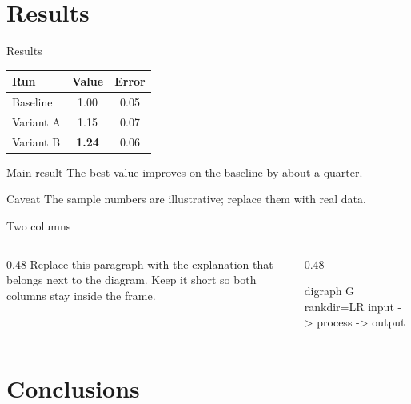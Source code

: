 \documentclass[aspectratio=169,14pt]{beamer}
\begin{document}
  \section{Results}

  \begin{frame}{Results}
    \begin{center}
      \begin{tabular}{lcc}
        \toprule
        Run & Value & Error \\
        \midrule
        Baseline & 1.00 & 0.05 \\
        Variant A & 1.15 & 0.07 \\
        Variant B & \textbf{1.24} & 0.06 \\
        \bottomrule
      \end{tabular}
    \end{center}
    \begin{block}{Main result}
      The best value improves on the baseline by about a quarter.
    \end{block}
    \begin{alertblock}{Caveat}
      The sample numbers are illustrative; replace them with real data.
    \end{alertblock}
  \end{frame}

  \begin{frame}{Two columns}
    \begin{columns}[T]
      \begin{column}{0.48\textwidth}
        Replace this paragraph with the explanation that belongs next to the
        diagram. Keep it short so both columns stay inside the frame.
      \end{column}
      \begin{column}{0.48\textwidth}
        \begin{graphviz}[style=monochrome, caption={Sample flow}]
          digraph G {
            rankdir=LR
            input -> process -> output
          }
        \end{graphviz}
      \end{column}
    \end{columns}
  \end{frame}

  \section{Conclusions}
\end{document}
